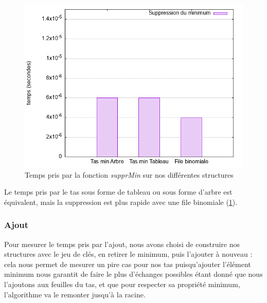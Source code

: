 \documentclass[12pt,a4paper]{article}
\begin{document}
\begin{figure}[hbtp]
\centering
\includegraphics[scale=0.5]{../Images/svg courbes pour rapport/temps_suppr_shakespeare.png}
\caption{Temps pris par la fonction \textit{supprMin} sur nos différentes structures}
\label{fig11}
\end{figure}


Le temps pris par le tas sous forme de tableau ou sous forme d'arbre est équivalent, mais la suppression est plus rapide avec une file binomiale (\ref{fig11}).

\subsubsection{Ajout}

Pour mesurer le temps pris par l'ajout, nous avons choisi de construire nos structures avec le jeu de clés, en retirer le minimum, puis l'ajouter à nouveau : cela nous permet de mesurer un pire cas pour nos tas puisqu'ajouter l'élément minimum nous garantit de faire le plus d'échanges possibles étant donné que nous l'ajoutons aux feuilles du tas, et que pour respecter sa propriété minimum, l'algorithme va le remonter jusqu'à la racine.
\end{document}
